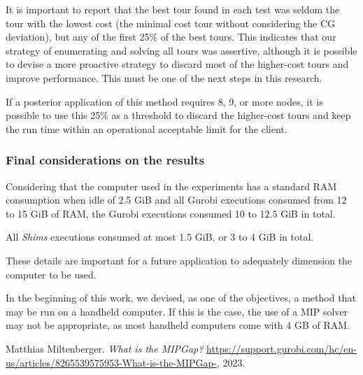 \documentclass[preprint]{elsarticle}
\begin{document}
{It is important to report that the best tour found in each test was seldom the tour with the lowest cost (the minimal cost tour without considering the CG deviation), but any of the first 25\% of the best tours. This indicates that our strategy of enumerating and solving all tours was assertive, although it is possible to devise a more proactive strategy to discard most of the higher-cost tours and improve performance. This must be one of the next steps in this research.

If a posterior application of this method requires 8, 9, or more nodes, it is possible to use this 25\% as a threshold to discard the higher-cost tours and keep the run time within an operational acceptable limit for the client.

\subsubsection{Final considerations on the results}

Considering that the computer used in the experiments has a standard RAM consumption when idle of 2.5 GiB and all Gurobi executions consumed from 12 to 15 GiB of RAM, the Gurobi executions consumed 10 to 12.5 GiB in total.

All {\it Shims} executions consumed at most 1.5 GiB, or 3 to 4 GiB in total.

These details are important for a future application to adequately dimension the computer to be used.

In the beginning of this work, we devised, as one of the objectives, a method that may be run on a handheld computer. If this is the case, the use of a MIP solver may not be appropriate, as most handheld computers come with 4 GB of RAM.

}

\begin{thebibliography}{00}
	
	 Matthias Miltenberger. {\it What is the MIPGap?} \url{https://support.gurobi.com/hc/en-us/articles/8265539575953-What-is-the-MIPGap-}, 2023.
	
\end{thebibliography}
\end{document}
